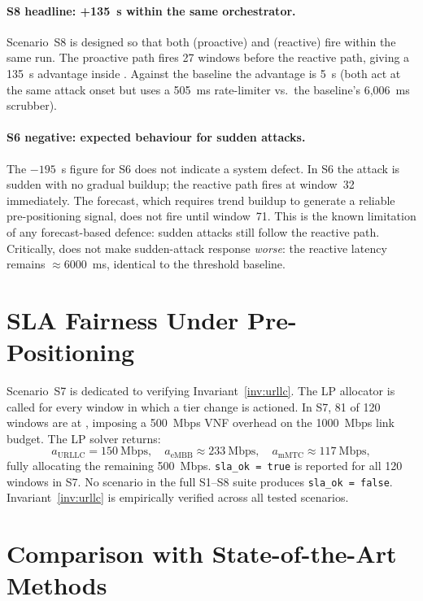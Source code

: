 \paragraph{S8 headline: +135~s within the same orchestrator.}
Scenario~S8 is designed so that both  (proactive) and 
(reactive) fire within the same run. The proactive path fires 27 windows
before the reactive path, giving a 135~s advantage inside \padonap{}.
Against the baseline the advantage is 5~s (both act at the same attack
onset but \padonap{} uses a 505~ms rate-limiter vs.\ the baseline's
6{,}006~ms scrubber).

\paragraph{S6 negative: expected behaviour for sudden attacks.}
The $-195$~s figure for S6 does not indicate a system defect. In S6 the
attack is sudden with no gradual buildup; the reactive path fires at
window~32 immediately. The forecast, which requires trend buildup to
generate a reliable pre-positioning signal, does not fire until
window~71. This is the known limitation of any forecast-based defence:
sudden attacks still follow the reactive path. Critically, \padonap{}
does not make sudden-attack response \emph{worse}: the  reactive
latency remains $\approx 6000$~ms, identical to the threshold baseline.

\section{SLA Fairness Under Pre-Positioning}
\label{sec:sla-fairness}

Scenario~S7 is dedicated to verifying Invariant~\ref{inv:urllc}.
The LP allocator is called for every window in which a tier change is
actioned. In S7, 81 of 120 windows are at , imposing a 500~Mbps
VNF overhead on the 1000~Mbps link budget. The LP solver returns:
\[
  a_{\text{URLLC}} = 150~\text{Mbps},\quad
  a_{\text{eMBB}} \approx 233~\text{Mbps},\quad
  a_{\text{mMTC}} \approx 117~\text{Mbps},
\]
fully allocating the remaining 500~Mbps. \texttt{sla\_ok = true} is
reported for all 120 windows in S7. No scenario in the full S1--S8 suite
produces \texttt{sla\_ok = false}. Invariant~\ref{inv:urllc} is
empirically verified across all tested scenarios.

\section{Comparison with State-of-the-Art Methods}
\label{sec:sota}

